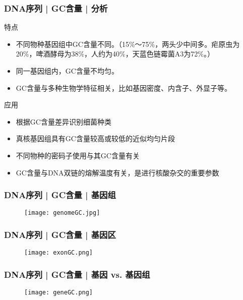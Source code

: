 \begin{frame}
  \frametitle{DNA序列 | GC含量 | 分析}
  \begin{block}{特点}
  \begin{itemize}
    \item 不同物种基因组中GC含量不同。（15\%～75\%，两头少中间多。疟原虫为20\%，啤酒酵母为38\%，人约为40\%，天蓝色链霉菌A3为72\%。）
    \item 同一基因组内，GC含量不均匀。
    \item GC含量与多种生物学特征相关，比如基因密度、内含子、外显子等。
  \end{itemize}
\end{block}
\pause
\begin{block}{应用}
  \begin{itemize}
    \item 根据GC含量差异识别细菌种类
    \item 真核基因组具有GC含量较高或较低的近似均匀片段
    \item 不同物种的密码子使用与其GC含量有关 
    \item GC含量与DNA双链的熔解温度有关，是进行核酸杂交的重要参数
  \end{itemize}
\end{block}
\end{frame}

\begin{frame}
  \frametitle{DNA序列 | GC含量 | 基因组}
  \begin{figure}
    \centering
    \texttt{[image: genomeGC.jpg]}
  \end{figure}
\end{frame}

\begin{frame}
  \frametitle{DNA序列 | GC含量 | 基因区}
  \begin{figure}
    \centering
    \texttt{[image: exonGC.png]}
  \end{figure}
\end{frame}

\begin{frame}
  \frametitle{DNA序列 | GC含量 | 基因 vs. 基因组}
  \begin{figure}
    \centering
    \texttt{[image: geneGC.png]}
  \end{figure}
\end{frame}

